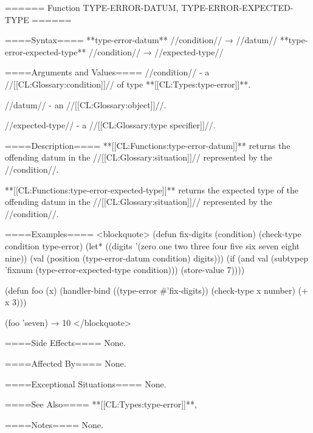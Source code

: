 ====== Function TYPE-ERROR-DATUM, TYPE-ERROR-EXPECTED-TYPE ======

====Syntax====
**type-error-datum** //condition// → //datum// **type-error-expected-type** //condition// → //expected-type//

====Arguments and Values====
//condition// - a //[[CL:Glossary:condition]]// of type **[[CL:Types:type-error]]**.

//datum// - an //[[CL:Glossary:object]]//.

//expected-type// - a //[[CL:Glossary:type specifier]]//.

====Description====
**[[CL:Functions:type-error-datum]]** returns the offending datum in the //[[CL:Glossary:situation]]// represented by the //condition//.

**[[CL:Functions:type-error-expected-type]]** returns the expected type of the offending datum in the //[[CL:Glossary:situation]]// represented by the //condition//.

====Examples====
<blockquote> (defun fix-digits (condition) (check-type condition type-error) (let* ((digits '(zero one two three four five six seven eight nine)) (val (position (type-error-datum condition) digits))) (if (and val (subtypep 'fixnum (type-error-expected-type condition))) (store-value 7))))

(defun foo (x) (handler-bind ((type-error #'fix-digits)) (check-type x number) (+ x 3)))

(foo 'seven) → 10 </blockquote>

====Side Effects====
None.

====Affected By====
None.

====Exceptional Situations====
None.

====See Also====
**[[CL:Types:type-error]]**,{\secref\Conditions}

====Notes====
None.

